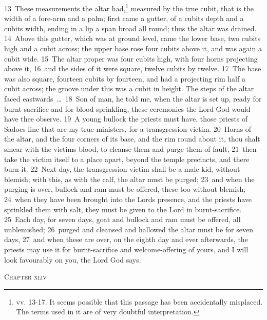 \documentclass[10pt]{book} %
\begin{document}
\textcolor{benred8}{13}~These measurements the altar had,\footnote[3]{vv. 13-17. It seems possible that this passage has been accidentally misplaced. The terms used in it are of very doubtful interpretation.} measured by the true cubit, that is the width of a fore-arm and a palm; first came a gutter, of a cubit\textquotesingle s depth and a cubit\textquotesingle s width, ending in a lip a span broad all round; thus the altar was drained. \textcolor{benred8}{14}~Above this gutter, which was at ground level, came the lower base, two cubits high and a cubit across; the upper base rose four cubits above it, and was again a cubit wide. \textcolor{benred8}{15}~The altar proper was four cubits high, with four horns projecting above it, \textcolor{benred8}{16}~and the sides of it were square, twelve cubits by twelve. \textcolor{benred8}{17}~The base was also square, fourteen cubits by fourteen, and had a projecting rim half a cubit across; the groove under this was a cubit in height. The steps of the altar faced eastwards~\ldots\ 
\textcolor{benred8}{18}~Son of man, he told me, when the altar is set up, ready for burnt-sacrifice and for blood-sprinkling, these ceremonies the Lord God would have thee observe. \textcolor{benred8}{19}~A young bullock the priests must have, those priests of Sadoc\textquotesingle s line that are my true ministers, for a transgression-victim. \textcolor{benred8}{20}~Horns of the altar, and the four corners of its base, and the rim round about it, thou shalt smear with the victim\textquotesingle s blood, to cleanse them and purge them of fault, \textcolor{benred8}{21}~then take the victim itself to a place apart, beyond the temple precincts, and there burn it. \textcolor{benred8}{22}~Next day, the transgression-victim shall be a male kid, without blemish; with this, as with the calf, the altar must be purged; \textcolor{benred8}{23}~and when the purging is over, bullock and ram must be offered, these too without blemish; \textcolor{benred8}{24}~when they have been brought into the Lord\textquotesingle s presence, and the priests have sprinkled them with salt, they must be given to the Lord in burnt-sacrifice. \textcolor{benred8}{25}~Each day, for seven days, goat and bullock and ram must be offered, all unblemished; \textcolor{benred8}{26}~purged and cleansed and hallowed the altar must be for seven days, \textcolor{benred8}{27}~and when these are over, on the eighth day and ever afterwards, the priests may use it for burnt-sacrifice and welcome-offering of yours, and I will look favourably on you, the Lord God says.
\begin{large}\begin{center}\textsc{Chapter xliv}\end{center}\end{large}
\end{document}

